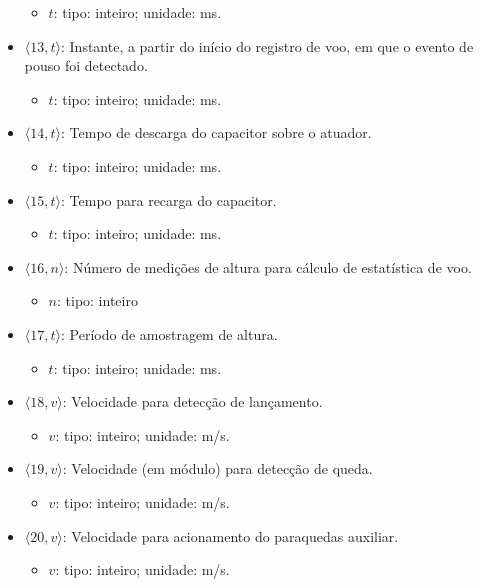 \documentclass[portuguese,10pt,a4paper]{article}
\begin{document}
\begin{itemize}
\begin{itemize}
		\item $t$: tipo: inteiro; unidade: ms.
	\end{itemize}
	\item $\langle 13, t\rangle$: Instante, a partir do início do registro de voo, em que o evento de pouso foi detectado.
	\begin{itemize}
		\item $t$: tipo: inteiro; unidade: ms.
	\end{itemize}	
	\item $\langle 14, t\rangle$: Tempo de descarga do capacitor sobre o atuador.
	\begin{itemize}
		\item $t$: tipo: inteiro; unidade: ms.
	\end{itemize}	
	\item $\langle 15, t\rangle$: Tempo para recarga do capacitor.
	\begin{itemize}
		\item $t$: tipo: inteiro; unidade: ms.
	\end{itemize}
	\item $\langle 16, n\rangle$: Número de medições de altura para cálculo de estatística de voo.
	\begin{itemize}
		\item $n$: tipo: inteiro
	\end{itemize}
	\item $\langle 17, t\rangle$: Período de amostragem de altura.
	\begin{itemize}
		\item $t$: tipo: inteiro; unidade: ms.
	\end{itemize}	
	\item $\langle 18, v\rangle$: Velocidade para detecção de lançamento.
	\begin{itemize}
		\item $v$: tipo: inteiro; unidade: m/s.
	\end{itemize}
	\item $\langle 19, v\rangle$: Velocidade (em módulo) para detecção de queda.
	\begin{itemize}
		\item $v$: tipo: inteiro; unidade: m/s.
	\end{itemize}
	\item $\langle 20, v\rangle$: Velocidade para acionamento do paraquedas auxiliar.
	\begin{itemize}
		\item $v$: tipo: inteiro; unidade: m/s.
	\end{itemize}

\end{itemize}
\end{document}
